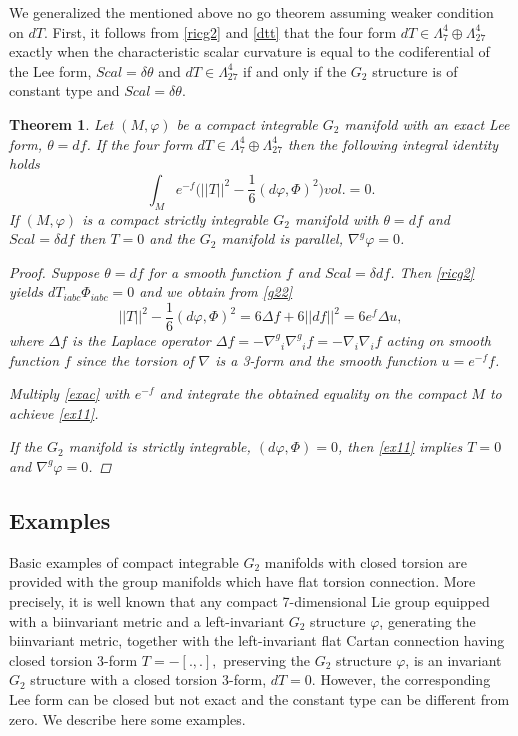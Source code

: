 \documentclass[10pt,british]{article}
\newtheorem{thrm}{Theorem}[section]
\def\d{\delta}
\def\sb {{\nabla}}
\def\LC{{\nabla^g}}
\def\p{{\varphi}}
\def\ph{{\Phi}}
\begin{document}
 We  generalized the mentioned above no go theorem   assuming weaker condition on $dT$. First, it follows from \eqref{ricg2} and \eqref{dtt} that the four form $dT\in\Lambda^4_7\oplus\Lambda^4_{27}$ exactly when the characteristic scalar curvature is equal to the codiferential of the Lee form, $Scal=\delta\theta$ and $dT\in\Lambda^4_{27}$ if and only if  
the $G_2$ structure is of constant type and  $Scal=\delta\theta$.
\begin{thrm}\label{exact}
Let $(M,\p)$ be a compact integrable  $G_2$ manifold with an exact Lee form, $\theta=df$. If the four form  $dT\in\Lambda^4_7\oplus\Lambda^4_{27}$  then the following integral identity holds
\begin{equation}\label{ex11}\int_Me^{-f}\Big(||T||^2-\frac16(d\p,\ph)^2 \Big)vol.=0.
\end{equation}
If $(M,\p)$ is a compact strictly integrable $G_2$ manifold with $\theta=df$ and $Scal=\d df$ 
then $T=0$ and  the $G_2$ manifold is parallel, $\LC\p=0$.
\begin{proof}
 Suppose $\theta=df$ for a smooth function $f$ and $Scal=\d df$. Then \eqref{ricg2} yields $dT_{iabc}\ph_{iabc}=0$ and we obtain from \eqref{g22} 
\begin{equation}\label{exac}
||T||^2-\frac16(d\p,\ph)^2=6\Delta f+6||df||^2=6e^{f}\Delta u,
\end{equation}
where $\Delta f$ is the Laplace operator $\Delta f=-\LC_i\LC_if=-\sb_i\sb_if$ acting on smooth function $f$ since the torsion of $\sb$ is  a 3-form and the smooth function $u=e^{-f}f$.

Multiply  \eqref{exac} with $e^{-f}$ and integrate the obtained equality on the compact $M$ to achieve \eqref{ex11}.%

If the $G_2$ manifold is strictly integrable, $(d\p,\ph)=0$, then \eqref{ex11} %
implies $T=0$ and $\LC\p=0$.
\end{proof}
\end{thrm}


\subsection{Examples}\label{bi}
 Basic examples of compact integrable $G_2$ manifolds with closed torsion are provided with the group manifolds which have flat torsion connection.  
 More precisely, it is well known that any compact 7-dimensional Lie group equipped with a biinvariant metric  and a left-invariant $G_2$ structure $\p$, generating the biinvariant metric, together with the left-invariant flat Cartan connection having closed torsion 3-form $T=-[.,.],$ preserving the $G_2$ structure $\p$, is an
invariant $G_2$ structure with a closed torsion 3-form, $dT=0$. However, the corresponding Lee form can be  closed but not exact and the constant type can be different from zero.
 We describe here some examples.
 
\end{document}
